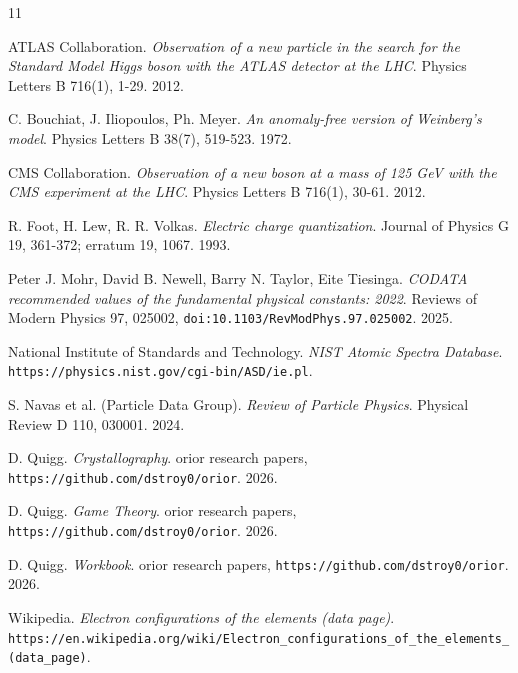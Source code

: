\backmatter
{}
\begin{thebibliography}{11}

ATLAS Collaboration. \emph{Observation of a new particle in the search for the Standard Model Higgs boson with the ATLAS detector at the LHC}. Physics Letters B 716(1), 1-29. 2012.

C. Bouchiat, J. Iliopoulos, Ph. Meyer. \emph{An anomaly-free version of Weinberg's model}. Physics Letters B 38(7), 519-523. 1972.

CMS Collaboration. \emph{Observation of a new boson at a mass of 125 GeV with the CMS experiment at the LHC}. Physics Letters B 716(1), 30-61. 2012.

R. Foot, H. Lew, R. R. Volkas. \emph{Electric charge quantization}. Journal of Physics G 19, 361-372; erratum 19, 1067. 1993.

Peter J. Mohr, David B. Newell, Barry N. Taylor, Eite Tiesinga. \emph{CODATA recommended values of the fundamental physical constants: 2022}. Reviews of Modern Physics 97, 025002, \texttt{doi:10.1103/\allowbreak{}RevModPhys.97.025002}. 2025.

National Institute of Standards and Technology. \emph{NIST Atomic Spectra Database}. \texttt{https:/\allowbreak{}/\allowbreak{}physics.nist.gov/\allowbreak{}cgi-bin/\allowbreak{}ASD/\allowbreak{}ie.pl}.

S. Navas et al. (Particle Data Group). \emph{Review of Particle Physics}. Physical Review D 110, 030001. 2024.

D. Quigg. \emph{Crystallography}. orior research papers, \texttt{https:/\allowbreak{}/\allowbreak{}github.com/\allowbreak{}dstroy0/\allowbreak{}orior}. 2026.

D. Quigg. \emph{Game Theory}. orior research papers, \texttt{https:/\allowbreak{}/\allowbreak{}github.com/\allowbreak{}dstroy0/\allowbreak{}orior}. 2026.

D. Quigg. \emph{Workbook}. orior research papers, \texttt{https:/\allowbreak{}/\allowbreak{}github.com/\allowbreak{}dstroy0/\allowbreak{}orior}. 2026.

Wikipedia. \emph{Electron configurations of the elements (data page)}. \texttt{https:/\allowbreak{}/\allowbreak{}en.wikipedia.org/\allowbreak{}wiki/\allowbreak{}Electron\_\allowbreak{}configurations\_\allowbreak{}of\_\allowbreak{}the\_\allowbreak{}elements\_\allowbreak{}(data\_\allowbreak{}page)}.

\end{thebibliography}
